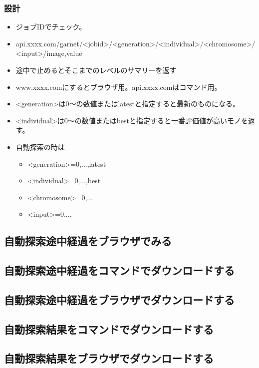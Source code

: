 \documentclass{jsbook}
\begin{document}
\subsubsection{設計}
\begin{itemize}
	\item ジョブIDでチェック。
	\item api.xxxx.com/garnet/<jobid>/<generation>/<individual>/<chromosome>/<input>/{image,value}
	\item 途中で止めるとそこまでのレベルのサマリーを返す
	\item www.xxxx.comにするとブラウザ用。api.xxxx.comはコマンド用。
	\item <generation>は0～の数値またはlatestと指定すると最新のものになる。
	\item <individual>は0～の数値またはbestと指定すると一番評価値が高いモノを返す。
	\item 自動探索の時は
	\begin{itemize}
		\item <generation>={0,...,latest}
		\item <individual>={0,...,best}
		\item <chromosome>={0,...}
		\item <input>={0,...}
	\end{itemize}
\end{itemize}


\subsection{自動探索途中経過をブラウザでみる}


\subsection{自動探索途中経過をコマンドでダウンロードする}


\subsection{自動探索途中経過をブラウザでダウンロードする}



\subsection{自動探索結果をコマンドでダウンロードする}


\subsection{自動探索結果をブラウザでダウンロードする}
\end{document}
